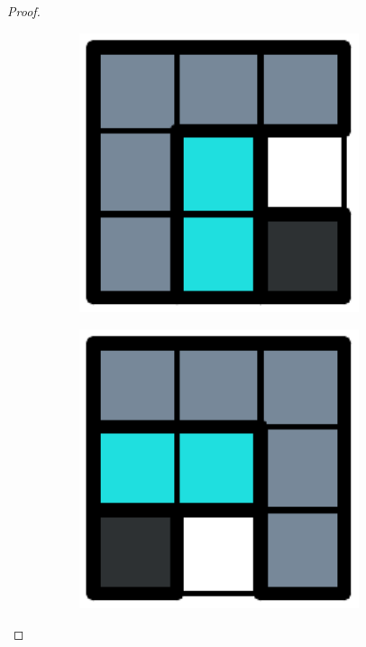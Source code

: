 \begin{proof}
\begin{figure}[h]
\begin{subfigure}[b]{0.1\textwidth}
    \caption{}
    \label{dom:turn4}
  \end{subfigure}
  \begin{subfigure}[b]{0.1\textwidth}
    \centering
    \includegraphics[width=0.9\textwidth]{pictures/dominoes/turns/turn_5.pdf}
    \caption{}
    \label{dom:turn5}
  \end{subfigure}
  \begin{subfigure}[b]{0.1\textwidth}
    \centering
    \includegraphics[width=0.9\textwidth]{pictures/dominoes/turns/turn_6.pdf}

\end{subfigure}
\end{figure}
\end{proof}
